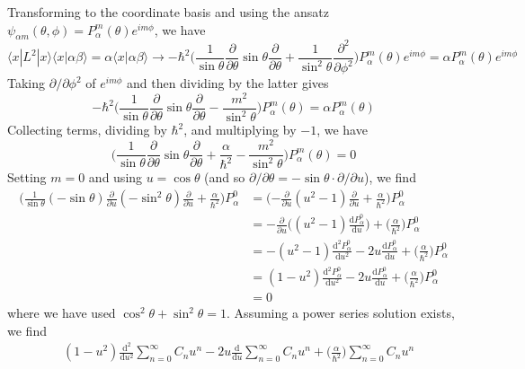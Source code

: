 \documentclass[../principles-of-quantum-mechanics.tex]{subfiles}
\begin{document}
\begin{questions}
		\begin{solution}
			Transforming to the coordinate basis and using the ansatz $\psi_{\alpha m}(\theta, \phi) = P_{\alpha}^m(\theta)e^{im\phi}$, we have
			$$\langle x|L^2|x\rangle\langle x|\alpha\beta\rangle = \alpha\langle x|\alpha \beta\rangle \to -\hbar^2\Big(\frac{1}{\sin\theta}\frac{\partial}{\partial\theta}\sin\theta\frac{\partial}{\partial\theta} + \frac{1}{\sin^2\theta}\frac{\partial^2}{\partial\phi^2}\Big)P_\alpha^m(\theta)e^{im\phi} = \alpha P_\alpha^m(\theta)e^{im\phi}$$
			Taking $\partial/\partial\phi^2$ of $e^{im\phi}$ and then dividing by the latter gives
			$$-\hbar^2\Big(\frac{1}{\sin\theta}\frac{\partial}{\partial\theta}\sin\theta\frac{\partial}{\partial\theta} - \frac{m^2}{\sin^2\theta}\Big)P_\alpha^m(\theta) = \alpha P_\alpha^m(\theta)$$
			Collecting terms, dividing by $\hbar^2$, and multiplying by ${-1}$, we have
			$$\Big(\frac{1}{\sin\theta}\frac{\partial}{\partial\theta}\sin\theta\frac{\partial}{\partial\theta} + \frac{\alpha}{\hbar^2} - \frac{m^2}{\sin^2\theta}\Big)P_\alpha^m(\theta) = 0$$
			Setting $m = 0$ and using $u = \cos\theta$ (and so $\partial/\partial\theta = -\sin\theta\cdot\partial/\partial u$), we find
			\begin{align*}
				\Big(\frac{1}{\sin\theta}(-\sin\theta)\frac{\partial}{\partial u} (-\sin^2\theta)\frac{\partial}{\partial u} + \frac{\alpha}{\hbar^2}\Big)P_\alpha^0 &= \Big({-\frac{\partial}{\partial u}}(u^2 - 1)\frac{\partial}{\partial u} + \frac{\alpha}{\hbar^2}\Big)P_{\alpha}^0 \\
				&= -\frac{\partial}{\partial u}\Big((u^2 - 1)\frac{\mathrm{d}P_\alpha^0}{\mathrm{d}u}\Big) + \Big(\frac{\alpha}{\hbar^2}\Big)P_\alpha^0 \\
				&= -(u^2 - 1)\frac{\mathrm{d}^2P_\alpha^0}{\mathrm{d}u^2} - 2u\frac{\mathrm{d}P_\alpha^0}{\mathrm{d}u} + \Big(\frac{\alpha}{\hbar^2}\Big)P_\alpha^0 \\
				&= (1 - u^2)\frac{\mathrm{d}^2P_\alpha^0}{\mathrm{d}u^2} - 2u\frac{\mathrm{d}P_\alpha^0}{\mathrm{d}u} + \Big(\frac{\alpha}{\hbar^2}\Big)P_\alpha^0 \\
				&= 0
			\end{align*}
			where we have used $\cos^2\theta + \sin^2\theta = 1$. Assuming a power series solution exists, we find
			\begin{align*}
				&(1 - u^2)\frac{\mathrm{d}^2}{\mathrm{d}u^2}\sum_{n=0}^\infty C_n u^n - 2u\frac{\mathrm{d}}{\mathrm{d}u}\sum_{n=0}^\infty C_n u^n + \Big(\frac{\alpha}{\hbar^2}\Big)\sum_{n=0}^\infty C_n u^n \\

\end{align*}
\end{solution}
\end{questions}
\end{document}
